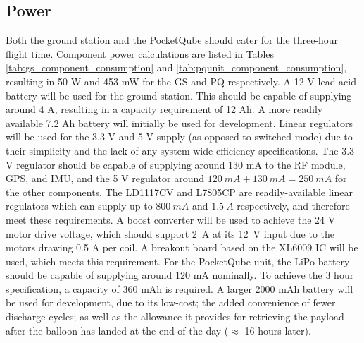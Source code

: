 \subsection{Power}
Both the ground station and the PocketQube should cater for the three-hour flight time. Component power calculations are listed in Tables \ref{tab:gs_component_consumption} and \ref{tab:pqunit_component_consumption}, resulting in 50 W and 453 mW for the GS and PQ respectively. A 12 V lead-acid battery will be used for the ground station. This should be capable of supplying around 4 A, resulting in a capacity requirement of 12 Ah. A more readily available 7.2 Ah battery will initially be used for development. Linear regulators will be used for the 3.3 V and 5 V supply (as opposed to switched-mode) due to their simplicity and the lack of any system-wide efficiency specifications. The 3.3 V regulator should be capable of supplying around 130 mA to the RF module, GPS, and IMU, and the 5 V regulator around $\SI{120}{mA} + \SI{130}{mA} = \SI{250}{mA}$ for the other components. The LD1117CV and L7805CP are readily-available linear regulators which can supply up to $\SI{800}{mA}$ and $\SI{1.5}{A}$ respectively, and therefore meet these requirements. A boost converter will be used to achieve the 24 V motor drive voltage, which should support \SI{2}{A} at its \SI{12}{V} input due to the motors drawing 0.5 A per coil. A breakout board based on the XL6009 IC will be used, which meets this requirement. For the PocketQube unit, the LiPo battery should be capable of supplying around 120 mA nominally. To achieve the 3 hour specification, a capacity of 360 mAh is required. A larger 2000 mAh battery will be used for development, due to its low-cost; the added convenience of fewer discharge cycles; as well as the allowance it provides for retrieving the payload after the balloon has landed at the end of the day ($\approx$ 16 hours later).